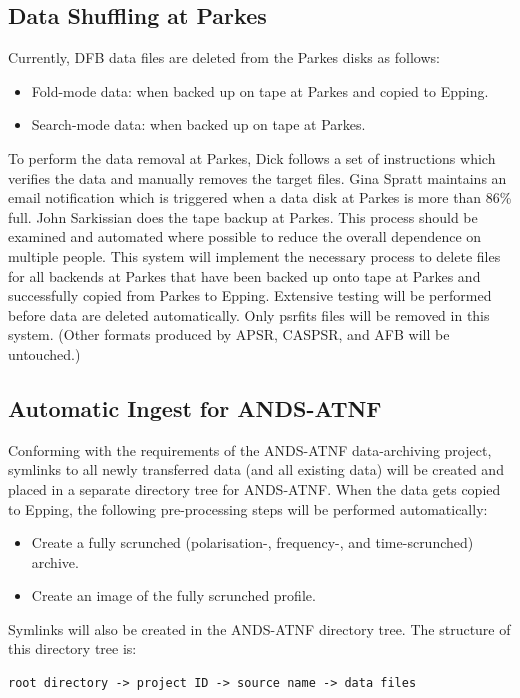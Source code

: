\documentclass{article}
\begin{document}
\subsection{Data Shuffling at Parkes}
Currently, DFB data files are deleted from the Parkes disks as follows:
\begin{itemize}
\item Fold-mode data: when backed up on tape at Parkes and copied to Epping.
\item Search-mode data: when backed up on tape at Parkes.
\end{itemize}

To perform the data removal at Parkes, Dick follows a set of instructions which verifies the data and manually removes the target files. Gina Spratt maintains an email notification which is triggered when a data disk at Parkes is more than 86\% full. John Sarkissian does the tape backup at Parkes. This process should be examined and automated where possible to reduce the overall dependence on multiple people. This system will implement the necessary process to delete files for all backends at Parkes that have been backed up onto tape at Parkes and successfully copied from Parkes to Epping. Extensive testing will be performed before data are deleted automatically. Only psrfits files will be removed in this system. (Other formats produced by APSR, CASPSR, and AFB will be untouched.)

\subsection{Automatic Ingest for ANDS-ATNF}
Conforming with the requirements of the ANDS-ATNF data-archiving project, symlinks to all newly transferred data (and all existing data) will be created and placed in a separate directory tree for ANDS-ATNF. When the data gets copied to Epping, the following pre-processing steps will be performed automatically:

\begin{itemize}
\item Create a fully scrunched (polarisation-, frequency-, and time-scrunched) archive.
\item Create an image of the fully scrunched profile.
\end{itemize}

Symlinks will also be created in the ANDS-ATNF directory tree. The structure of this directory tree is:

\begin{verbatim}
root directory -> project ID -> source name -> data files
\end{verbatim}
\end{document}
